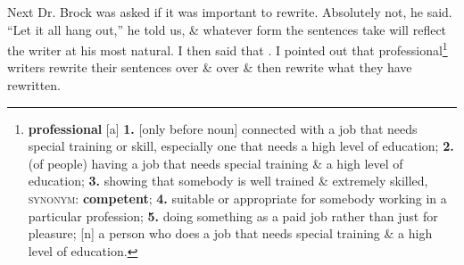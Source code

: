 \documentclass[oneside]{book}
\numberwithin{equation}{section}
\begin{document}
Next Dr. Brock was asked if it was important to rewrite. Absolutely not, he said. ``Let it all hang out,'' he told us, \& whatever form the sentences take will reflect the writer at his most natural. I then said that . I pointed out that professional\footnote{\textbf{professional} [a] \textbf{1.} [only before noun] connected with a job that needs special training or skill, especially one that needs a high level of education; \textbf{2.} (of people) having a job that needs special training \& a high level of education; \textbf{3.} showing that somebody is well trained \& extremely skilled, \textsc{synonym}: \textbf{competent}; \textbf{4.} suitable or appropriate for somebody working in a particular profession; \textbf{5.} doing something as a paid job rather than just for pleasure; [n] a person who does a job that needs special training \& a high level of education.} writers rewrite their sentences over \& over \& then rewrite what they have rewritten.
\end{document}
